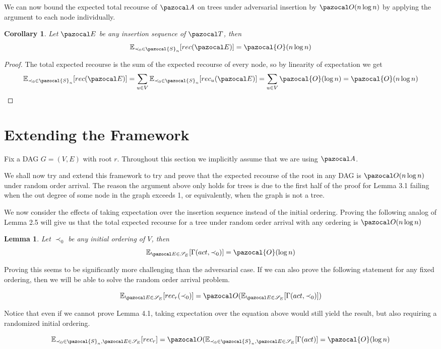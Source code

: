 \documentclass{article}
\newtheorem{lemma}[theorem]{Lemma}
\newtheorem{corollary}[theorem]{Corollary}
\begin{document}
We can now bound the expected total recourse of $\pazocal A$ on trees under adversarial insertion by $\pazocal O(n \log n)$ by applying the argument to each node individually.

\begin{corollary}
Let $\pazocal E$ be any insertion sequence of $\pazocal T$, then
\[ \mathbb{E}_{\prec_0 \in \pazocal{S}_n}[ rec(\pazocal E)] = \pazocal{O}(n\log n) \]
\end{corollary}

\begin{proof}
The total expected recourse is the sum of the expected recourse of every node, so by linearity of expectation we get
\[ \mathbb{E}_{\prec_0 \in \pazocal{S}_n}[ rec(\pazocal E)] = \sum_{u \in V} \mathbb{E}_{\prec_0 \in \pazocal{S}_n}[ rec_u(\pazocal E)] = \sum_{u \in V} \pazocal{O}(\log n) = \pazocal{O}(n\log n) \]
\end{proof}

\section{Extending the Framework}

Fix a DAG $G=(V,E)$ with root $r$. Throughout this section we implicitly assume that we are using $\pazocal A$.

We shall now try and extend this framework to try and prove that the expected recourse of the root in any DAG is $\pazocal O(n \log n)$ under random order arrival. The reason the argument above only holds for trees is due to the first half of the proof for Lemma 3.1 failing when the out degree of some node in the graph exceeds 1, or equivalently, when the graph is not a tree.

We now consider the effects of taking expectation over the insertion sequence instead of the initial ordering. Proving the following analog of Lemma 2.5 will give us that the total expected recourse for a tree under random order arrival with any ordering is $\pazocal O(n \log n)$

\begin{lemma}
Let $\prec_0$ be any initial ordering of $V$, then
\[ \mathbb{E}_{\pazocal E \in \mathcal{S}_{E}}[\Gamma(act,\prec_0)] = \pazocal{O}(\log n) \]
\end{lemma}

Proving this seems to be significantly more challenging than the adversarial case. If we can also prove the following statement for any fixed ordering, then we will be able to solve the random order arrival problem.

\[ \mathbb{E}_{\pazocal E \in \mathcal{S}_{E}}[rec_r(\prec_0)] = \pazocal O(\mathbb{E}_{\pazocal E \in \mathcal{S}_{E}}[\Gamma(act,\prec_0)]) \]

Notice that even if we cannot prove Lemma 4.1, taking expectation over the equation above would still yield the result, but also requiring a randomized initial ordering.

\[ \mathbb{E}_{\prec_0 \in \pazocal{S}_n, \pazocal E \in \mathcal{S}_{E}}[rec_r] = \pazocal O(\mathbb{E}_{\prec_0 \in \pazocal{S}_n, \pazocal E \in \mathcal{S}_{E}}[\Gamma(act)] = \pazocal{O}(\log n) \]
\end{document}
